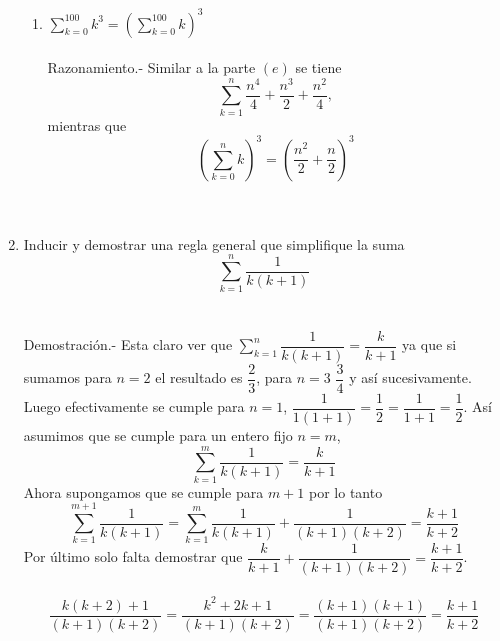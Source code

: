 \begin{enumerate}
\begin{enumerate}[\bfseries (a)]
\item $\displaystyle\sum_{k=0}^{100} k^3 = \left( \sum_{k=0}^{100} k \right) ^3$\\\\
Razonamiento.- \; Similar a  la parte $(e)$ se tiene $$\sum\limits_{k=1}^{n} \dfrac{n^4}{4} + \dfrac{n^3}{2} + \dfrac{n^2}{4},$$ mientras que $$\left( \sum\limits_{k=0}^{n} k \right)^3 = \left( \dfrac{n^2}{2} + \dfrac{n}{2}\right)^3$$\\\\
\end{enumerate} 

\item Inducir y demostrar una regla general que simplifique la suma $$\displaystyle\sum_{k=1}^{n} \dfrac{1}{k(k+1)}$$\\\\
Demostración.- \; Esta claro ver que $\sum\limits_{k=1}^{n} \dfrac{1}{k(k+1)} = \dfrac{k}{k+1}$ ya que si sumamos para $n=2$ el resultado es $\dfrac{2}{3}$, para $n=3$ $\dfrac{3}{4}$ y así sucesivamente.\\
Luego efectivamente se cumple para $n=1$,  $\dfrac{1}{1(1+1)} = \dfrac{1}{2} = \dfrac{1}{1+1} = \dfrac{1}{2}$. 
Así asumimos que se cumple para un entero fijo $n=m$,
$$\sum\limits_{k=1}^{m} \dfrac{1}{k(k+1)} = \dfrac{k}{k+1}$$
Ahora supongamos que se cumple para $m+1$ por lo tanto $$\sum\limits_{k=1}^{m+1} \dfrac{1}{k(k+1)} = \sum\limits_{k=1}^{m} \dfrac{1}{k(k+1)} + \dfrac{1}{(k+1)(k+2)} = \dfrac{k+1}{k+2}$$
Por último solo falta demostrar que $ \dfrac{k}{k+1} + \dfrac{1}{(k+1)(k+2)} = \dfrac{k+1}{k+2}$.\\\\
$$\dfrac{k(k+2)+1}{(k+1)(k+2)} = \dfrac{k^2 + 2k +1}{(k+1)(k+2)} = \dfrac{(k+1)(k+1)}{(k+1)(k+2)} = \dfrac{k+1}{k+2}$$\\\\


\end{enumerate}
